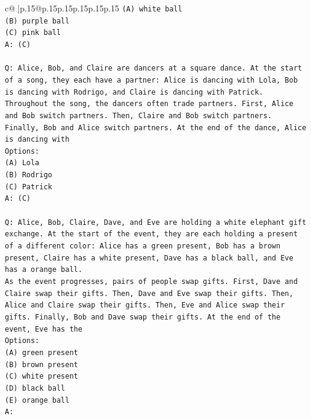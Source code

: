 \documentclass{article}
\begin{document}
{\begin{supertabular}{c@{$\;$}|p{.15\linewidth}@{}p{.15\linewidth}p{.15\linewidth}p{.15\linewidth}p{.15\linewidth}p{.15\linewidth}}
{{{\texttt{(A) white ball} \\
\texttt{(B) purple ball} \\
\texttt{(C) pink ball} \\
\texttt{A: (C)} \\
\\ 
\texttt{Q: Alice, Bob, and Claire are dancers at a square dance. At the start of a song, they each have a partner: Alice is dancing with Lola, Bob is dancing with Rodrigo, and Claire is dancing with Patrick.} \\
\texttt{Throughout the song, the dancers often trade partners. First, Alice and Bob switch partners. Then, Claire and Bob switch partners. Finally, Bob and Alice switch partners. At the end of the dance, Alice is dancing with} \\
\texttt{Options:} \\
\texttt{(A) Lola} \\
\texttt{(B) Rodrigo} \\
\texttt{(C) Patrick} \\
\texttt{A: (C)} \\
\\ 
\texttt{Q: Alice, Bob, Claire, Dave, and Eve are holding a white elephant gift exchange. At the start of the event, they are each holding a present of a different color: Alice has a green present, Bob has a brown present, Claire has a white present, Dave has a black ball, and Eve has a orange ball.} \\
\texttt{As the event progresses, pairs of people swap gifts. First, Dave and Claire swap their gifts. Then, Dave and Eve swap their gifts. Then, Alice and Claire swap their gifts. Then, Eve and Alice swap their gifts. Finally, Bob and Dave swap their gifts. At the end of the event, Eve has the} \\
\texttt{Options:} \\
\texttt{(A) green present} \\
\texttt{(B) brown present} \\
\texttt{(C) white present} \\
\texttt{(D) black ball} \\
\texttt{(E) orange ball} \\
\texttt{A:} \\
            }
        }
    }
     \\ \\


\end{supertabular}}
\end{document}
